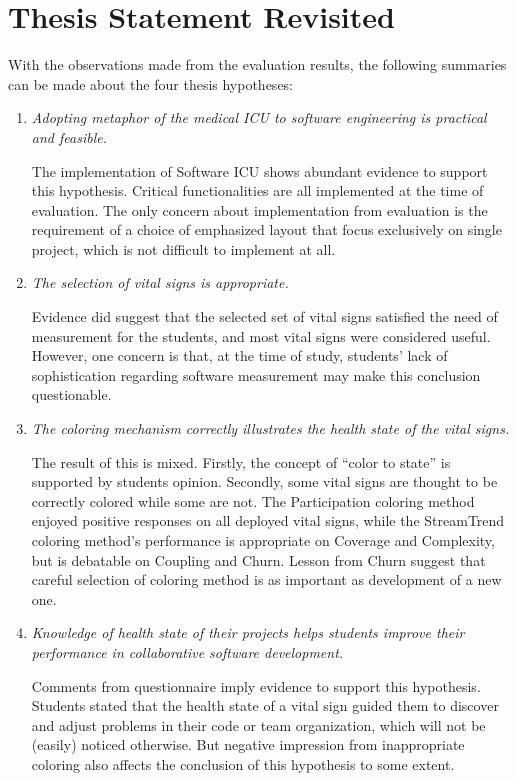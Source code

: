 \section {Thesis Statement Revisited}
With the observations made from the evaluation results, the following summaries can be made about the four thesis hypotheses:
\begin{enumerate}
\item {\it Adopting metaphor of the medical ICU to software engineering is practical and feasible.}

The implementation of Software ICU shows abundant evidence to support this hypothesis. Critical functionalities are all implemented at the time of evaluation. The only concern about implementation from evaluation is the requirement of a choice of emphasized layout that focus  exclusively on single project, which is not difficult to implement at all.
\item {\it The selection of vital signs is appropriate.}

Evidence did suggest that the selected set of vital signs satisfied the need of measurement for the students, and most vital signs were considered useful. However, one concern is that, at the time of study, students' lack of sophistication regarding software measurement may make this conclusion questionable.
\item {\it The coloring mechanism correctly illustrates the health state of the vital signs.}

The result of this is mixed. Firstly, the concept of ``color to state'' is supported by students opinion. Secondly, some vital signs are thought to be correctly colored while some are not. The Participation coloring method enjoyed positive responses on all deployed vital signs, while the StreamTrend coloring method's performance is appropriate on Coverage and Complexity, but is debatable on Coupling and Churn. Lesson from Churn suggest that careful selection of coloring method is as important as development of a new one.
\item {\it Knowledge of health state of their projects helps students improve their performance in collaborative software development.}

Comments from questionnaire imply evidence to support this hypothesis. Students stated that the health state of a vital sign guided them to discover and adjust problems in their code or team organization, which will not be (easily) noticed otherwise. But negative impression from inappropriate coloring also affects the conclusion of this hypothesis to some extent. 
\end{enumerate}

